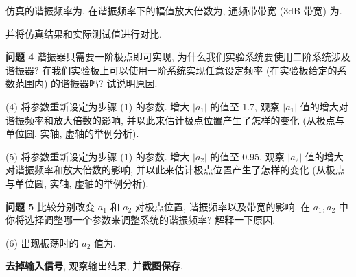 \documentclass{dspreport}
\begin{document}
\begin{block}

\end{block}

\begin{figure}[H]

\end{figure}

\begin{block}

\end{block}

仿真的谐振频率为\underline{\blank{  }}, 在谐振频率下的幅值放大倍数为\underline{\blank{  }}, 通频带带宽 (3dB 带宽) 为\underline{\blank{  }}.

并将仿真结果和实际测试值进行对比.

\textbf{问题 4} 谐振器只需要一阶极点即可实现, 为什么我们实验系统要使用二阶系统涉及谐振器? 在我们实验板上可以使用一阶系统实现任意设定频率 (在实验板给定的系数范围内) 的谐振器吗? 试说明原因.

\begin{block}

\end{block}

(4) 将参数重新设定为步骤 (1) 的参数. 增大 $|a_1|$ 的值至 1.7, 观察 $|a_1|$ 值的增大对谐振频率和放大倍数的影响, 并以此来估计极点位置产生了怎样的变化 (从极点与单位圆, 实轴, 虚轴的举例分析).

\begin{block}

\end{block}

(5) 将参数重新设定为步骤 (1) 的参数. 增大 $|a_2|$ 的值至 0.95, 观察 $|a_2|$ 值的增大对谐振频率和放大倍数的影响, 并以此来估计极点位置产生了怎样的变化 (从极点与单位圆, 实轴, 虚轴的举例分析).

\begin{block}

\end{block}

\textbf{问题 5} 比较分别改变 $a_1$ 和 $a_2$ 对极点位置, 谐振频率以及带宽的影响. 在 $a_1, a_2$ 中你将选择调整哪一个参数来调整系统的谐振频率? 解释一下原因.

\begin{block}

\end{block}

(6) 出现振荡时的 $a_2$ 值为\underline{\blank{  }}.

\textbf{去掉输入信号}, 观察输出结果, 并\textbf{截图保存}.
\end{document}
